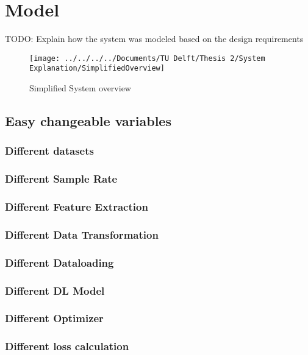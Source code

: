 \chapter{Model}

TODO: Explain how the system was modeled based on the design requirements

\begin{figure}[h]
	\centering
	\texttt{[image: ../../../../Documents/TU Delft/Thesis 2/System Explanation/SimplifiedOverview]}
	\caption{Simplified System overview}
\end{figure}


\section{Easy changeable variables}

\subsection{Different datasets}

\subsection{Different Sample Rate}

\subsection{Different Feature Extraction}

\subsection{Different Data Transformation}

\subsection{Different Dataloading}

\subsection{Different DL Model}

\subsection{Different Optimizer}

\subsection{Different loss calculation}

